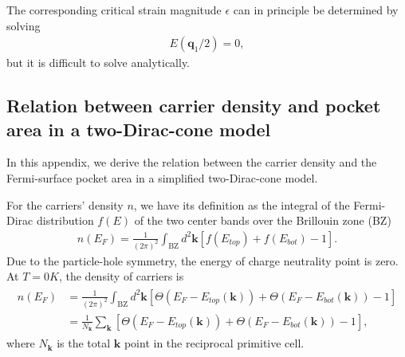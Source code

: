 \documentclass[10pt, oneside]{article}
\newcommand{\mr}[1]{\mathrm{#1}}
\newcommand{\p}[1]{\left(#1\right)}
\newcommand{\bb}[1]{\left[#1\right]}
\begin{document}
The corresponding critical strain magnitude \(\epsilon\) can in principle be determined by solving
\begin{align}
	E(\bm{q}_1/2)=0,
\end{align}
but it is difficult to solve analytically.

\subsection{Relation between carrier density and pocket area in a two-Dirac-cone model}

In this appendix, we derive the relation between the carrier density and the Fermi-surface pocket area in a simplified two-Dirac-cone model. 

For the carriers' density \(n\), we have its definition as the integral of the Fermi-Dirac distribution \(f\p{E}\) of the two center bands over the Brillouin zone (BZ)
\begin{align}
	n\p{E_{F}} = \frac{1}{\p{2 \pi}^2} \int_{\mr{BZ}} d^2 \bm{k} \bb{f\p{E_{top}} + f\p{E_{bot}} - 1}.
\end{align}
Due to the particle-hole symmetry, the energy of charge neutrality point is zero. At \(T = 0 K\), the density of carriers is 
\begin{align}
	\begin{split}
		n\p{E_F} & = \frac{1}{\p{2 \pi}^2} \int_{\mr{BZ}} d^2 \bm{k} \bb{\Theta \p{E_{F} - E_{top} \p{\bm{k}}} + \Theta \p{E_{F} - E_{bot} \p{\bm{k}}} - 1} \\
		& = \frac{1}{N_{\bm{k}}} \sum_{\bm{k}} \bb{\Theta \p{E_{F} - E_{top}\p{\bm{k}}} + \Theta \p{E_{F} - E_{bot} \p{\bm{k}}} - 1},
	\end{split}
\end{align}
where \(N_{\bm{k}}\) is the total \(\bm{k}\) point in the reciprocal primitive cell.
\end{document}
